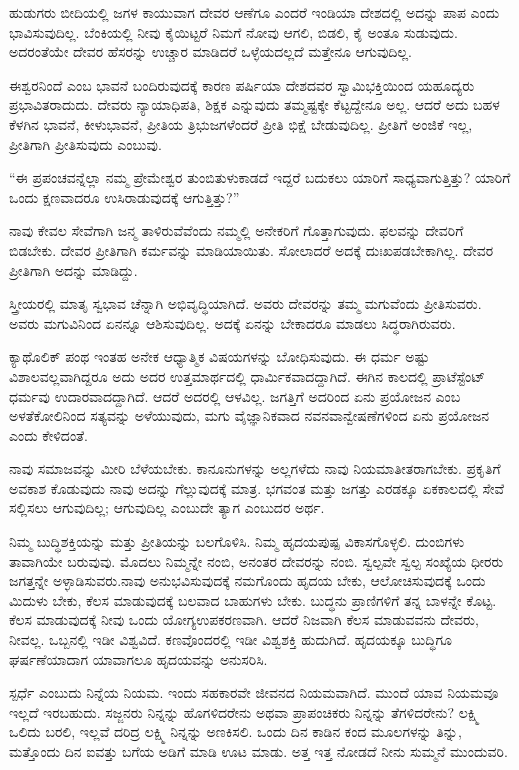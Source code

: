ಹುಡುಗರು ಬೀದಿಯಲ್ಲಿ ಜಗಳ ಕಾಯುವಾಗ ದೇವರ ಆಣೆಗೂ ಎಂದರೆ ಇಂಡಿಯಾ ದೇಶದಲ್ಲಿ ಅದನ್ನು ಪಾಪ ಎಂದು ಭಾವಿಸುವುದಿಲ್ಲ. ಬೆಂಕಿಯಲ್ಲಿ ನೀವು ಕೈಯಿಟ್ಟರೆ ನಿಮಗೆ ನೋವು ಆಗಲಿ, ಬಿಡಲಿ, ಕೈ ಅಂತೂ ಸುಡುವುದು. ಅದರಂತೆಯೇ ದೇವರ ಹೆಸರನ್ನು ಉಚ್ಚಾರ ಮಾಡಿದರೆ ಒಳ್ಳೆಯದಲ್ಲದೆ ಮತ್ತೇನೂ ಆಗುವುದಿಲ್ಲ.

ಈಶ್ವರನಿಂದೆ  ಎಂಬ ಭಾವನೆ ಬಂದಿರುವುದಕ್ಕೆ ಕಾರಣ ಪರ್ಷಿಯಾ ದೇಶದವರ ಸ್ವಾಮಿಭಕ್ತಿಯಿಂದ ಯಹೂದ್ಯರು ಪ್ರಭಾವಿತರಾದುದು. ದೇವರು ನ್ಯಾಯಾಧಿಪತಿ, ಶಿಕ್ಷಕ ಎನ್ನುವುದು ತಮ್ಮಷ್ಟಕ್ಕೇ ಕೆಟ್ಟದ್ದೇನೂ ಅಲ್ಲ. ಆದರೆ ಅದು ಬಹಳ ಕೆಳಗಿನ ಭಾವನೆ, ಕೀಳುಭಾವನೆ, ಪ್ರೀತಿಯ ತ್ರಿಭುಜಗಳೆಂದರೆ ಪ್ರೀತಿ ಭಿಕ್ಷೆ ಬೇಡುವುದಿಲ್ಲ. ಪ್ರೀತಿಗೆ ಅಂಜಿಕೆ ಇಲ್ಲ, ಪ್ರೀತಿಗಾಗಿ ಪ್ರೀತಿಸುವುದು ಎಂಬುವು.

“ಈ ಪ್ರಪಂಚವನ್ನೆಲ್ಲಾ ನಮ್ಮ ಪ್ರೇಮೇಶ್ವರ ತುಂಬಿತುಳುಕಾಡದೆ ಇದ್ದರೆ ಬದುಕಲು ಯಾರಿಗೆ ಸಾಧ್ಯವಾಗುತ್ತಿತ್ತು? ಯಾರಿಗೆ ಒಂದು ಕ್ಷಣವಾದರೂ ಉಸಿರಾಡುವುದಕ್ಕೆ ಆಗುತ್ತಿತ್ತು?”

ನಾವು ಕೇವಲ ಸೇವೆಗಾಗಿ ಜನ್ಮ ತಾಳಿರುವೆವೆಂದು ನಮ್ಮಲ್ಲಿ ಅನೇಕರಿಗೆ ಗೊತ್ತಾಗುವುದು. ಫಲವನ್ನು ದೇವರಿಗೆ ಬಿಡಬೇಕು. ದೇವರ ಪ್ರೀತಿಗಾಗಿ ಕರ್ಮವನ್ನು ಮಾಡಿಯಾಯಿತು. ಸೋಲಾದರೆ ಅದಕ್ಕೆ ದುಃಖಪಡಬೇಕಾಗಿಲ್ಲ. ದೇವರ ಪ್ರೀತಿಗಾಗಿ ಅದನ್ನು ಮಾಡಿದ್ದು.

ಸ್ತ್ರೀಯರಲ್ಲಿ ಮಾತೃ ಸ್ವಭಾವ ಚೆನ್ನಾಗಿ ಅಭಿವೃದ್ಧಿಯಾಗಿದೆ. ಅವರು ದೇವರನ್ನು ತಮ್ಮ ಮಗುವೆಂದು ಪ್ರೀತಿಸುವರು. ಅವರು ಮಗುವಿನಿಂದ ಏನನ್ನೂ ಆಶಿಸುವುದಿಲ್ಲ. ಅದಕ್ಕೆ ಏನನ್ನು ಬೇಕಾದರೂ ಮಾಡಲು ಸಿದ್ಧರಾಗಿರುವರು.

ಕ್ಯಾಥೊಲಿಕ್​ ಪಂಥ ಇಂತಹ ಅನೇಕ ಆಧ್ಯಾತ್ಮಿಕ ವಿಷಯಗಳನ್ನು ಬೋಧಿಸುವುದು. ಈ ಧರ್ಮ ಅಷ್ಟು ವಿಶಾಲವಲ್ಲವಾಗಿದ್ದರೂ ಅದು ಅದರ ಉತ್ತಮಾರ್ಥದಲ್ಲಿ ಧಾರ್ಮಿಕವಾದ\-ದ್ದಾಗಿದೆ. ಈಗಿನ ಕಾಲದಲ್ಲಿ ಪ್ರಾಟೆಸ್ಟೆಂಟ್​ ಧರ್ಮವು ಉದಾರವಾದದ್ದಾಗಿದೆ. ಆದರೆ ಅದರಲ್ಲಿ ಆಳವಿಲ್ಲ. ಜಗತ್ತಿಗೆ ಅದರಿಂದ ಏನು ಪ್ರಯೋಜನ ಎಂಬ ಅಳತೆಕೋಲಿನಿಂದ ಸತ್ಯವನ್ನು ಅಳೆಯುವುದು, ಮಗು ವೈಜ್ಞಾನಿಕವಾದ ನವನವಾನ್ವೇಷಣೆಗಳಿಂದ ಏನು ಪ್ರಯೋಜನ ಎಂದು ಕೇಳಿದಂತೆ.

\eject

ನಾವು ಸಮಾಜವನ್ನು ಮೀರಿ ಬೆಳೆಯಬೇಕು. ಕಾನೂನುಗಳನ್ನು ಅಲ್ಲಗಳೆದು ನಾವು ನಿಯಮಾತೀತರಾಗಬೇಕು. ಪ್ರಕೃತಿಗೆ ಅವಕಾಶ ಕೊಡುವುದು ನಾವು ಅದನ್ನು ಗೆಲ್ಲುವುದಕ್ಕೆ ಮಾತ್ರ. ಭಗವಂತ ಮತ್ತು ಜಗತ್ತು ಎರಡಕ್ಕೂ ಏಕಕಾಲದಲ್ಲಿ ಸೇವೆ ಸಲ್ಲಿಸಲು ಆಗುವುದಿಲ್ಲ; ಆಗುವುದಿಲ್ಲ ಎಂಬುದೇ ತ್ಯಾಗ ಎಂಬುದರ ಅರ್ಥ.

ನಿಮ್ಮ ಬುದ್ಧಿಶಕ್ತಿಯನ್ನು ಮತ್ತು ಪ್ರೀತಿಯನ್ನು ಬಲಗೊಳಿಸಿ. ನಿಮ್ಮ ಹೃದಯಪುಷ್ಪ ವಿಕಾಸಗೊಳ್ಳಲಿ. ದುಂಬಿಗಳು ತಾವಾಗಿಯೇ ಬರುವುವು. ಮೊದಲು ನಿಮ್ಮನ್ನೇ ನಂಬಿ, ಅನಂತರ ದೇವರನ್ನು ನಂಬಿ. ಸ್ವಲ್ಪವೇ ಸ್ವಲ್ಪ ಸಂಖ್ಯೆಯ ಧೀರರು ಜಗತ್ತನ್ನೇ ಅಳ್ಳಾಡಿಸುವರು.\break ನಾವು ಅನುಭವಿಸುವುದಕ್ಕೆ ನಮಗೊಂದು ಹೃದಯ ಬೇಕು, ಆಲೋಚಿಸುವುದಕ್ಕೆ ಒಂದು ಮಿದುಳು ಬೇಕು, ಕೆಲಸ ಮಾಡುವುದಕ್ಕೆ ಬಲವಾದ ಬಾಹುಗಳು ಬೇಕು. ಬುದ್ಧನು ಪ್ರಾಣಿಗಳಿಗೆ ತನ್ನ ಬಾಳನ್ನೇ ಕೊಟ್ಟ. ಕೆಲಸ ಮಾಡುವುದಕ್ಕೆ ನೀವು ಒಂದು ಯೋಗ್ಯ\break ಉಪಕರಣವಾಗಿ. ಆದರೆ ನಿಜವಾಗಿ ಕೆಲಸ ಮಾಡುವವನು ದೇವರು, ನೀವಲ್ಲ. ಒಬ್ಬನಲ್ಲಿ ಇಡೀ ವಿಶ್ವವಿದೆ. ಕಣವೊಂದರಲ್ಲಿ ಇಡೀ ವಿಶ್ವಶಕ್ತಿ ಹುದುಗಿದೆ. ಹೃದಯಕ್ಕೂ ಬುದ್ಧಿಗೂ ಘರ್ಷಣೆಯಾದಾಗ ಯಾವಾಗಲೂ ಹೃದಯವನ್ನು ಅನುಸರಿಸಿ.

ಸ್ಪರ್ಧೆ ಎಂಬುದು ನಿನ್ನೆಯ ನಿಯಮ. ಇಂದು ಸಹಕಾರವೇ ಜೀವನದ ನಿಯಮ\-ವಾಗಿದೆ. ಮುಂದೆ ಯಾವ ನಿಯಮವೂ ಇಲ್ಲದೆ ಇರಬಹುದು. ಸಜ್ಜನರು ನಿನ್ನನ್ನು ಹೊಗಳಿದರೇನು ಅಥವಾ ಪ್ರಾಪಂಚಿಕರು ನಿನ್ನನ್ನು ತೆಗಳಿದರೇನು? ಲಕ್ಷ್ಮಿ ಒಲಿದು ಬರಲಿ, ಇಲ್ಲವೆ ದರಿದ್ರ ಲಕ್ಷ್ಮಿ ನಿನ್ನನ್ನು ಅಣಕಿಸಲಿ. ಒಂದು ದಿನ ಕಾಡಿನ ಕಂದ ಮೂಲಗಳನ್ನು ತಿನ್ನು, ಮತ್ತೊಂದು ದಿನ ಐವತ್ತು ಬಗೆಯ ಅಡಿಗೆ ಮಾಡಿ ಊಟ ಮಾಡು. ಅತ್ತ ಇತ್ತ ನೋಡದೆ ನೀನು ಸುಮ್ಮನೆ ಮುಂದುವರಿ.

